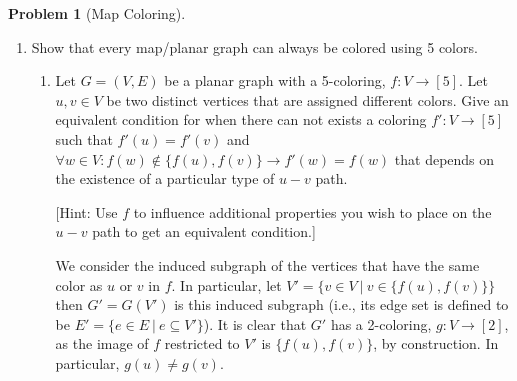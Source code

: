 \documentclass{article}
\theoremstyle{plain}
\theoremstyle{definition}
\newtheorem{problem}{Problem}
\newcommand{\DisplaySolutions}{true} %
\newcommand{\ra}{\rightarrow}
\begin{document}
\begin{problem}[Map Coloring]
\begin{enumerate}
\begin{enumerate}
\begin{solution}
                Next, we consider the graph, \(G'\), to be the graph \(G\) but without the vertex \(v\). In particular we let \(V' = V \setminus \{v\}\) and \(E' = \{e \in E\ |\ e \in 2^{V'}\}\), then \(G' = (V',E')\). It is clear that \(G'\) is a graph on \(|V| - 1 = k\) vertices. It is planar because if \(G\) has an orientation (a way to draw \(G\) on a plane such that no edge crossed), then \(G'\) will have the same orientation except without \(v\) and all of it's edges removed. And thus \(G'\) is also planar.  
            
                By the inductive hypothesis we have that \(G'\) has a valid coloring of no more than 6 colors. Let this coloring be denoted by \(f' : V' \ra [6]\). We then define a coloring for \(G\) as \(f : V \ra [6]\), where \(f(u) = f'(u)\) for all \(v \in V'\). Then \(f(v)\) can be defined to be a color in the set \([6] \setminus \{f'(v_1), \dotsc, f'(v_5)\}\), which is non empty because there are 6 colors. It then follows that \(f(v) \neq f'(v_i)\) for all \(i \in [5]\) (i.e., for all of \(v\)'s neighbors). And thus, \(G\) has a color of no more than \(6\) colors.

                Thus, by induction, any planar graph can always be colored using 6 colors.
            \end{solution}
        \end{enumerate}

        \ifthenelse{\equal{\DisplaySolutions}{true}}{}{\newpage}

        \item\label{5_color_thm} Show that every map/planar graph can always be colored using 5 colors.

        \begin{enumerate}
            \item\label{prob_recolor} Let \(G = (V,E)\) be a planar graph with a 5-coloring, \(f: V \ra [5]\). Let \(u,v \in V\) be two distinct vertices that are assigned different colors.
            Give an equivalent condition for when there can not exists a coloring \(f': V \ra [5]\) such that \(f'(u) = f'(v)\) and \(\forall w \in V : f(w) \notin \{f(u), f(v)\} \ra f'(w) = f(w)\) that depends on the existence of a particular type of \(u-v\) path.

            [Hint: Use \(f\) to influence additional properties you wish to place on the \(u-v\) path to get an equivalent condition.]

            \begin{solution}
                We consider the induced subgraph of the vertices that have the same color as \(u\) or \(v\) in \(f\). In particular, let \(V' = \{v \in V\ |\ v \in \{f(u), f(v)\}\}\) then \(G' = G(V')\) is this induced subgraph (i.e., its edge set is defined to be \(E' = \{e \in E\ |\ e \subseteq V'\}\)). It is clear that \(G'\) has a 2-coloring, \(g: V \ra [2]\), as the image of \(f\) restricted to \(V'\) is \(\{f(u), f(v)\}\), by construction. In particular, \(g(u) \neq g(v)\). 
                

\end{solution}
\end{enumerate}
\end{enumerate}
\end{problem}
\end{document}
